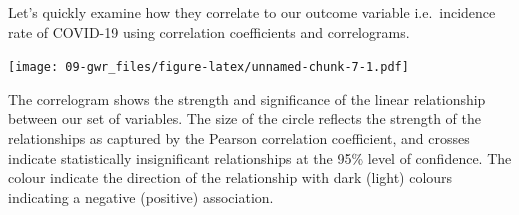 \documentclass[
]{book}
\newenvironment{Shaded}{\begin{snugshade}}{\end{snugshade}}
\newcommand{\CommentTok}[1]{\textcolor[rgb]{0.56,0.35,0.01}{\textit{#1}}}
\newcommand{\DataTypeTok}[1]{\textcolor[rgb]{0.13,0.29,0.53}{#1}}
\newcommand{\DecValTok}[1]{\textcolor[rgb]{0.00,0.00,0.81}{#1}}
\newcommand{\FloatTok}[1]{\textcolor[rgb]{0.00,0.00,0.81}{#1}}
\newcommand{\KeywordTok}[1]{\textcolor[rgb]{0.13,0.29,0.53}{\textbf{#1}}}
\newcommand{\NormalTok}[1]{#1}
\newcommand{\OperatorTok}[1]{\textcolor[rgb]{0.81,0.36,0.00}{\textbf{#1}}}
\newcommand{\OtherTok}[1]{\textcolor[rgb]{0.56,0.35,0.01}{#1}}
\newcommand{\StringTok}[1]{\textcolor[rgb]{0.31,0.60,0.02}{#1}}
\begin{document}
Let's quickly examine how they correlate to our outcome variable i.e.~incidence rate of COVID-19 using correlation coefficients and correlograms.

\begin{Shaded}
\end{Shaded}

\texttt{[image: 09-gwr\_files/figure-latex/unnamed-chunk-7-1.pdf]}

The correlogram shows the strength and significance of the linear relationship between our set of variables. The size of the circle reflects the strength of the relationships as captured by the Pearson correlation coefficient, and crosses indicate statistically insignificant relationships at the 95\% level of confidence. The colour indicate the direction of the relationship with dark (light) colours indicating a negative (positive) association.
\end{document}
